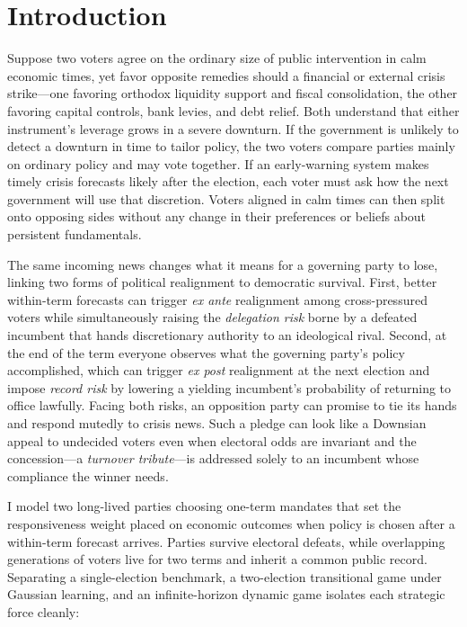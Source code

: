 \documentclass[11pt,letterpaper]{article}
\begin{document}
\section{Introduction}\label{sec:intro}

Suppose two voters agree on the ordinary size of public intervention in calm economic times, yet favor opposite remedies should a financial or external crisis strike---one favoring orthodox liquidity support and fiscal consolidation, the other favoring capital controls, bank levies, and debt relief. Both understand that either instrument's leverage grows in a severe downturn. If the government is unlikely to detect a downturn in time to tailor policy, the two voters compare parties mainly on ordinary policy and may vote together. If an early-warning system makes timely crisis forecasts likely after the election, each voter must ask how the next government will use that discretion. Voters aligned in calm times can then split onto opposing sides without any change in their preferences or beliefs about persistent fundamentals.

The same incoming news changes what it means for a governing party to lose, linking two forms of political realignment to democratic survival. First, better within-term forecasts can trigger \emph{ex ante} realignment among cross-pressured voters while simultaneously raising the \emph{delegation risk} borne by a defeated incumbent that hands discretionary authority to an ideological rival. Second, at the end of the term everyone observes what the governing party's policy accomplished, which can trigger \emph{ex post} realignment at the next election and impose \emph{record risk} by lowering a yielding incumbent's probability of returning to office lawfully. Facing both risks, an opposition party can promise to tie its hands and respond mutedly to crisis news. Such a pledge can look like a Downsian appeal to undecided voters even when electoral odds are invariant and the concession---a \emph{turnover tribute}---is addressed solely to an incumbent whose compliance the winner needs.

I model two long-lived parties choosing one-term mandates that set the responsiveness weight placed on economic outcomes when policy is chosen after a within-term forecast arrives. Parties survive electoral defeats, while overlapping generations of voters live for two terms and inherit a common public record. Separating a single-election benchmark, a two-election transitional game under Gaussian learning, and an infinite-horizon dynamic game isolates each strategic force cleanly:
\end{document}
